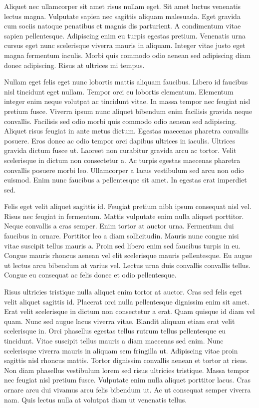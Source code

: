 \documentclass[twocolumn,twoside]{base/ajstd}
\begin{document}
Aliquet nec ullamcorper sit amet risus nullam eget. Sit amet luctus venenatis lectus magna. Vulputate sapien nec sagittis aliquam malesuada. Eget gravida cum sociis natoque penatibus et magnis dis parturient. A condimentum vitae sapien pellentesque. Adipiscing enim eu turpis egestas pretium. Venenatis urna cursus eget nunc scelerisque viverra mauris in aliquam. Integer vitae justo eget magna fermentum iaculis. Morbi quis commodo odio aenean sed adipiscing diam donec adipiscing. Risus at ultrices mi tempus.

Nullam eget felis eget nunc lobortis mattis aliquam faucibus. Libero id faucibus nisl tincidunt eget nullam. Tempor orci eu lobortis elementum. Elementum integer enim neque volutpat ac tincidunt vitae. In massa tempor nec feugiat nisl pretium fusce. Viverra ipsum nunc aliquet bibendum enim facilisis gravida neque convallis. Facilisis sed odio morbi quis commodo odio aenean sed adipiscing. Aliquet risus feugiat in ante metus dictum. Egestas maecenas pharetra convallis posuere. Eros donec ac odio tempor orci dapibus ultrices in iaculis. Ultrices gravida dictum fusce ut. Laoreet non curabitur gravida arcu ac tortor. Velit scelerisque in dictum non consectetur a. Ac turpis egestas maecenas pharetra convallis posuere morbi leo. Ullamcorper a lacus vestibulum sed arcu non odio euismod. Enim nunc faucibus a pellentesque sit amet. In egestas erat imperdiet sed.

Felis eget velit aliquet sagittis id. Feugiat pretium nibh ipsum consequat nisl vel. Risus nec feugiat in fermentum. Mattis vulputate enim nulla aliquet porttitor. Neque convallis a cras semper. Enim tortor at auctor urna. Fermentum dui faucibus in ornare. Porttitor leo a diam sollicitudin. Mauris nunc congue nisi vitae suscipit tellus mauris a. Proin sed libero enim sed faucibus turpis in eu. Congue mauris rhoncus aenean vel elit scelerisque mauris pellentesque. Eu augue ut lectus arcu bibendum at varius vel. Lectus urna duis convallis convallis tellus. Congue eu consequat ac felis donec et odio pellentesque.

Risus ultricies tristique nulla aliquet enim tortor at auctor. Cras sed felis eget velit aliquet sagittis id. Placerat orci nulla pellentesque dignissim enim sit amet. Erat velit scelerisque in dictum non consectetur a erat. Quam quisque id diam vel quam. Nunc sed augue lacus viverra vitae. Blandit aliquam etiam erat velit scelerisque in. Orci phasellus egestas tellus rutrum tellus pellentesque eu tincidunt. Vitae suscipit tellus mauris a diam maecenas sed enim. Nunc scelerisque viverra mauris in aliquam sem fringilla ut. Adipiscing vitae proin sagittis nisl rhoncus mattis. Tortor dignissim convallis aenean et tortor at risus. Non diam phasellus vestibulum lorem sed risus ultricies tristique. Massa tempor nec feugiat nisl pretium fusce. Vulputate enim nulla aliquet porttitor lacus. Cras ornare arcu dui vivamus arcu felis bibendum ut. Ac ut consequat semper viverra nam. Quis lectus nulla at volutpat diam ut venenatis tellus.
\end{document}
